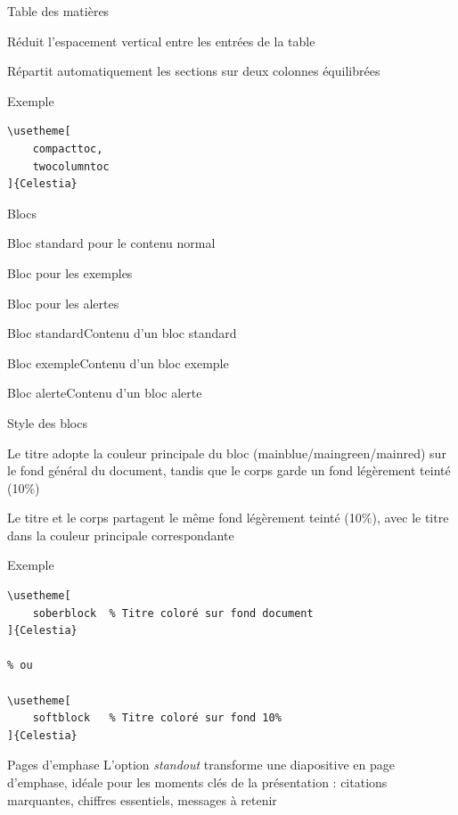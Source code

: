 \documentclass[%
    10pt,
    french,
    aspectratio=1610,
    xcolor=svgnames
]{beamer}
\begin{document}
\begin{frame}[fragile]{Table des matières}
    \begin{description}[twocolumntoc]
        \item[compacttoc] Réduit l'espacement vertical entre les entrées de la table
        \item[twocolumntoc] Répartit automatiquement les sections sur deux colonnes équilibrées
    \end{description}

    \begin{exampleblock}{Exemple}
        \begin{lstlisting}[style=latex]
\usetheme[
    compacttoc,
    twocolumntoc
]{Celestia}
        \end{lstlisting}
    \end{exampleblock}
\end{frame}

\begin{frame}{Blocs}
    \begin{description}[exampleblock]
        \item[block] Bloc standard pour le contenu normal
        \item[exampleblock] Bloc pour les exemples
        \item[alertblock] Bloc pour les alertes
    \end{description}

    \begin{block}{Bloc standard}Contenu d'un bloc standard\end{block}
    \begin{exampleblock}{Bloc exemple}Contenu d'un bloc exemple\end{exampleblock}
    \begin{alertblock}{Bloc alerte}Contenu d'un bloc alerte\end{alertblock}
\end{frame}

\begin{frame}[fragile]{Style des blocs}
    \begin{description}[soberblock]
        \item[soberblock] Le titre adopte la couleur principale du bloc (mainblue/maingreen/mainred) sur le fond général du document, tandis que le corps garde un fond légèrement teinté (10\%)
        \item[softblock] Le titre et le corps partagent le même fond légèrement teinté (10\%), avec le titre dans la couleur principale correspondante
    \end{description}

    \begin{exampleblock}{Exemple}
        \begin{lstlisting}[style=latex]
\usetheme[
    soberblock  % Titre coloré sur fond document
]{Celestia}

% ou

\usetheme[
    softblock   % Titre coloré sur fond 10%
]{Celestia}
        \end{lstlisting}
    \end{exampleblock}

\end{frame}

\begin{frame}[standout]{Pages d'emphase}
    L'option \emph{standout} transforme une diapositive en page d'emphase, idéale pour les moments clés de la présentation : citations marquantes, chiffres essentiels, messages à retenir
\end{frame}
\end{document}
